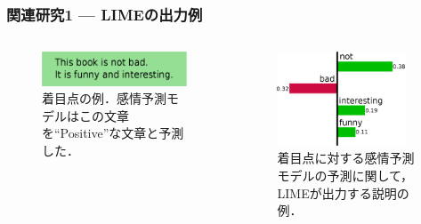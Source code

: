 \documentclass[aspectratio=169]{slide-ja}
\begin{document}
\begin{frame}
  \frametitle{関連研究1 — LIMEの出力例}
  \begin{columns}[]
    \begin{column}{0.35\textwidth}
      \vspace{4.2em}
      \begin{figure}
        \includegraphics[width=\textwidth]{example-instance}
        \vspace{0.8em}
        \caption{%
          着目点の例．感情予測モデルはこの文章を``Positive''な文章と予測した．
        }
      \end{figure}
    \end{column}
    \begin{column}{0.4\textwidth}
      \begin{figure}
        \includegraphics[width=0.9\textwidth]{example-lime}
        \caption{%
          着目点に対する感情予測モデルの予測に関して，LIMEが出力する説明の例．
        }
      \end{figure}
    \end{column}
  \end{columns}
\end{frame}
\end{document}
